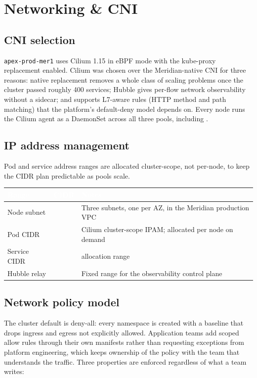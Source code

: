 \section{Networking \& CNI}

\subsection{CNI selection}
\texttt{apex-prod-mer1} uses Cilium 1.15 in eBPF mode with the kube-proxy replacement enabled. Cilium was chosen over the Meridian-native CNI for three reasons: native  replacement removes a whole class of  scaling problems once the cluster passed roughly 400 services; Hubble gives per-flow network observability without a sidecar; and  supports L7-aware rules (HTTP method and path matching) that the platform's default-deny model depends on. Every node runs the Cilium agent as a DaemonSet across all three pools, including .

\subsection{IP address management}
Pod and service address ranges are allocated cluster-scope, not per-node, to keep the CIDR plan predictable as pools scale.

\begin{center}
\begin{tabularx}{\linewidth}{@{}l l L@{}}
\toprule
{}
\textcolor{white}{\textbf{Range}} & \textcolor{white}{\textbf{CIDR}} & \textcolor{white}{\textbf{Notes}} \\
\midrule
Node subnet &  & Three subnets, one per AZ, in the Meridian production VPC \\
Pod CIDR &  & Cilium cluster-scope IPAM;  allocated per node on demand \\
Service CIDR &  &  allocation range \\
Hubble relay &  & Fixed range for the observability control plane \\
\bottomrule
\end{tabularx}
\end{center}

\subsection{Network policy model}
The cluster default is deny-all: every namespace is created with a baseline  that drops ingress and egress not explicitly allowed. Application teams add scoped allow rules through their own manifests rather than requesting exceptions from platform engineering, which keeps ownership of the policy with the team that understands the traffic. Three properties are enforced regardless of what a team writes:


